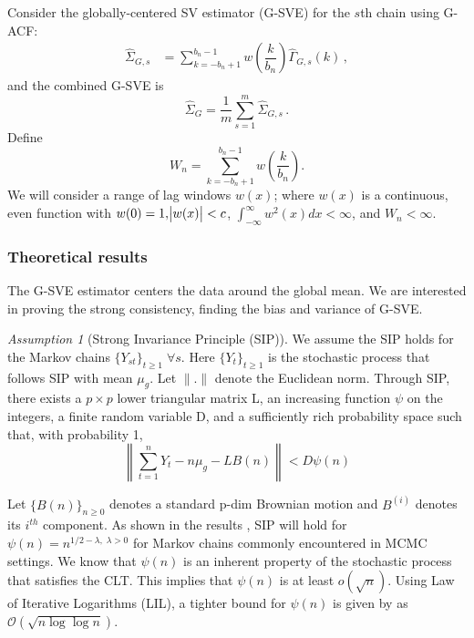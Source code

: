 \documentclass[11pt]{article}
\theoremstyle{remark}
\newtheorem{ass}{Assumption}
\begin{document}
Consider the globally-centered SV estimator (G-SVE) for the $s$th chain using G-ACF:
%
\begin{align*}
    \hat{\Sigma}_{G,s} &= \sum_{k=-b_n+1}^{b_n-1}w\left(\dfrac{k}{b_n}\right)\hat{\Gamma}_{G,s}(k)\,,
\end{align*}
and the combined G-SVE is
\[
\hat{\Sigma}_{G} =  \dfrac{1}{m}\sum_{s=1}^{m}\hat{\Sigma}_{G,s}\,.
\]
Define
%
\[
W_n = \sum_{k=-b_n+1}^{b_n-1}w\left(\dfrac{k}{b_n}\right).
\]
We will consider a range of lag windows $w(x)$; where $w(x)$ is a continuous, even function with $w(0)=1, \abs{w(x)} < c$, $\int_{-\infty}^{\infty}w^2(x)dx < \infty$, and $W_n < \infty$. 


\subsubsection{Theoretical results} \label{sec:G-SVE}

The G-SVE estimator centers the data around the global mean. We are interested in proving the strong consistency, finding the bias and variance of G-SVE. 

\begin{ass}[Strong Invariance Principle (SIP)] \label{ass:sip}
    We assume the SIP holds for the Markov chains $\{Y_{st}\}_{t \geq 1} \; \forall s$. Here $\{Y_t\}_{t\geq 1}$ is the stochastic process that follows SIP with mean $\mu_g$. Let $\|.\|$ denote the Euclidean norm. Through SIP, there exists a $p \times p$ lower triangular matrix L, an increasing function $\psi$ on the integers, a finite random variable D, and a  sufficiently rich probability space such that, with probability 1, \\
  $$\left\|\sum_{t=1}^{n}Y_t - n\mu_g - LB(n)\right\| < D\psi(n)$$
  
  Let $\{B(n)\}_{n\geq 0}$ denotes a standard p-dim Brownian motion and $B^{(i)}$ denotes its $i^{th}$ component. As shown in the results \cite{kuelbs1980almost}, SIP will hold for $\psi(n) = n^{1/2 - \lambda, \; \lambda > 0}$ for Markov chains commonly encountered in MCMC settings. We know that $\psi(n)$ is an inherent property of the stochastic process that satisfies the CLT. This implies that $\psi(n)$ is at least $o(\sqrt{n})$. Using Law of Iterative Logarithms (LIL), a tighter bound for $\psi(n)$ is given by \cite{stra:1964} as $\mathcal{O}(\sqrt{n\log \log n})$.
\end{ass}
\end{document}

